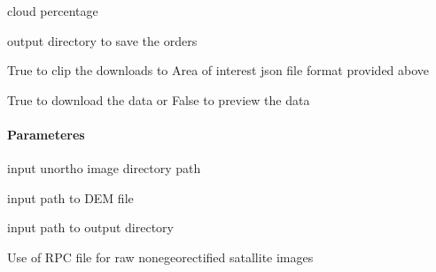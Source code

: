 \documentclass[letterpaper,10pt,english]{sphinxmanual}
\begin{document}
\begin{fulllineitems}
\begin{description}
\sphinxAtStartPar
cloud percentage

\sphinxAtStartPar
output directory to save the orders

\sphinxAtStartPar
True to clip the downloads to Area of interest json file format provided above

\sphinxAtStartPar
True to download the data or False to preview the data

\end{description}

\end{fulllineitems}


\begin{fulllineitems}
\label{\detokenize{akhdefo_functions:akhdefo_functions.Akhdefo_utils.akhdefo_orthorectify}}
\pysigstartsignatures
{}
\pysigstopsignatures

\paragraph{Parameteres}
\label{\detokenize{akhdefo_functions:parameteres}}\begin{description}
\sphinxAtStartPar
input unortho image directory path

\sphinxAtStartPar
input path to DEM file

\sphinxAtStartPar
input path to output directory

\sphinxAtStartPar
Use of RPC file for raw none\sphinxhyphen{}georectified satallite images

\end{description}

\end{fulllineitems}
\end{document}
